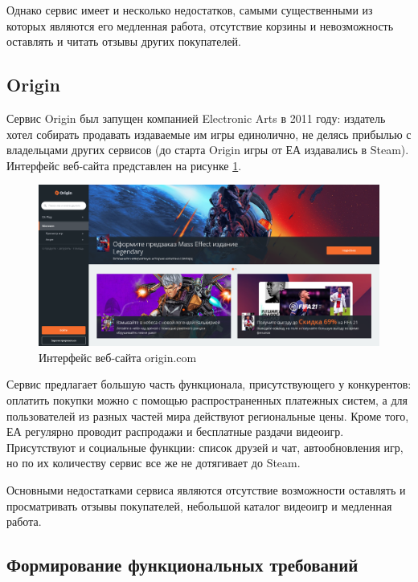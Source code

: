 Однако сервис имеет и несколько недостатков, самыми существенными из которых являются его медленная работа, отсутствие корзины и невозможность оставлять и читать отзывы других покупателей.

\subsection{Origin}
\label{sec:analogues:origin}

Сервис Origin был запущен компанией Electronic Arts в 2011 году: издатель хотел собирать продавать издаваемые им игры единолично, не делясь прибылью с владельцами других сервисов (до старта Origin игры от ЕА издавались в Steam).
Интерфейс веб-сайта представлен на рисунке \ref*{sec:analogues:origin:layout}.

\begin{figure}[!htb]
	\centering
	  \includegraphics[scale=0.3]{attachments/origin.png}  
	  \caption{ Интерфейс веб-сайта origin.com }
	  \label{sec:analogues:origin:layout}
\end{figure}

Сервис предлагает большую часть функционала, присутствующего у конкурентов: оплатить покупки можно с помощью распространенных платежных систем, а для пользователей из разных частей мира действуют региональные цены. Кроме того, ЕА регулярно проводит распродажи и бесплатные раздачи видеоигр. Присутствуют и социальные функции: список друзей и чат, автообновления игр, но по их количеству сервис все же не дотягивает до Steam.

Основными недостатками сервиса являются отсутствие возможности оставлять и просматривать отзывы покупателей, небольшой каталог видеоигр и медленная работа.

\subsection{Формирование функциональных требований}
\label{sec:analogues:requirements}

